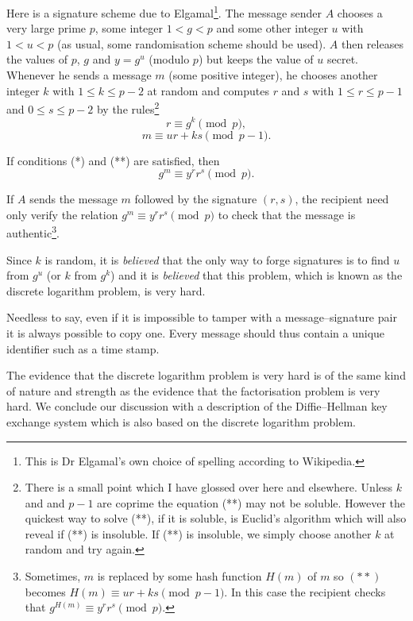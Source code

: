 Here is a signature  scheme due to 
Elgamal\footnote{This 
is Dr Elgamal's own choice of spelling 
according to Wikipedia.}\label{P;Elgamal}.
The message sender $A$ chooses a very large
prime $p$, some integer $1<g<p$
and some other integer $u$ with $1<u<p$
(as usual, some randomisation scheme should be used).
$A$ then releases the values of $p$, $g$
and $y=g^{u}$ (modulo $p$) but keeps the
value of $u$ secret. Whenever he sends
a message $m$ (some positive integer),
he chooses another integer $k$
with $1\leq k\leq p-2$ at random
and computes
$r$ and $s$ with $1\leq r\leq p-1$
and $0\leq s\leq p-2$
by the rules\footnote{There is
a small point which
I have glossed over here and elsewhere.
Unless $k$ and and $p-1$ are coprime
the equation (**) may not be soluble.
However the quickest way to solve (**),
if it is soluble, is Euclid's algorithm
which will also reveal if (**) is
insoluble. If (**) is insoluble, we simply
choose another $k$ at random and try
again.}
\begin{equation*}
r\equiv g^{k} \pmod{p},\tag*{(*)}
\end{equation*}
\begin{equation*}
m\equiv ur+ks \pmod{p-1}.\tag*{(**)}
\end{equation*}
\begin{lemma} If conditions (*) and (**) are satisfied,
then
\[g^{m}\equiv y^{r}r^{s}\pmod{p}.\]
\end{lemma}
\noindent
If $A$ sends the message $m$ followed by the signature $(r,s)$,
the recipient need only verify the relation
$g^{m}\equiv y^{r}r^{s}\pmod{p}$ to check
that the message is authentic\footnote{Sometimes,
$m$ is replaced by some hash function $H(m)$ of $m$
so $(**)$ becomes $H(m)\equiv ur+ks \pmod{p-1}$.
In this case the recipient
checks that $g^{H(m)}\equiv y^{r}r^{s}\pmod{p}$.}.

Since $k$ is random, it is \emph{believed} that the
only way to forge signatures is to find $u$
from $g^{u}$ (or $k$ from $g^{k}$) and it is \emph{believed}
that this problem, which is known as
the discrete logarithm problem, is very
hard.

Needless to say, even if it is impossible to
tamper with a message--signature pair it is always
possible to copy one. Every message should thus
contain a unique identifier such as a time stamp.

The evidence that the  discrete logarithm problem is very
hard is of the same kind of nature and strength
as the evidence that the factorisation problem
is very hard. We conclude our discussion with
a description of the Diffie--Hellman key exchange
system which is also based on the discrete logarithm problem.

